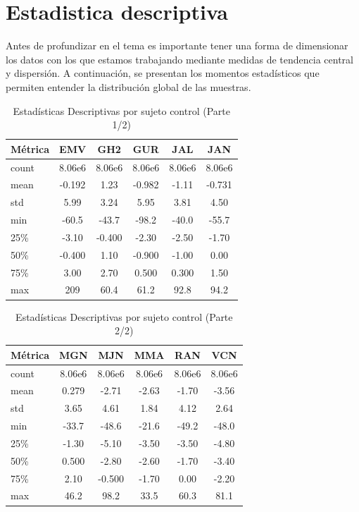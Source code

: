 \section{Estadistica descriptiva}
Antes de profundizar en el tema es importante tener una forma de dimensionar los datos con
los que estamos trabajando mediante medidas de tendencia central y dispersión. A continuación, se
presentan los momentos estadísticos que permiten entender la distribución global de las muestras.

\begin{table}[H]
\centering
\caption{Estadísticas Descriptivas por sujeto control (Parte 1/2)}
\label{tab:estadisticas1}
\begin{tabular}{lSSSSS}
\toprule
\textbf{Métrica} & \textbf{EMV} & \textbf{GH2} & \textbf{GUR} & \textbf{JAL} & \textbf{JAN} \\
\midrule
count & 8.06e6 & 8.06e6 & 8.06e6 & 8.06e6 & 8.06e6 \\
mean  & -0.192 & 1.23  & -0.982 & -1.11 & -0.731 \\
std   & 5.99  & 3.24  & 5.95  & 3.81 & 4.50  \\
min   & -60.5 & -43.7 & -98.2 & -40.0 & -55.7 \\
25\%  & -3.10 & -0.400 & -2.30 & -2.50 & -1.70 \\
50\%  & -0.400 & 1.10 & -0.900 & -1.00 & 0.00 \\
75\%  & 3.00 & 2.70 & 0.500 & 0.300 & 1.50 \\
max   & 209 & 60.4 & 61.2 & 92.8 & 94.2 \\
\bottomrule
\end{tabular}
\end{table}

\begin{table}[h]
\centering
\caption{Estadísticas Descriptivas por sujeto control (Parte 2/2)}
\label{tab:estadisticas2}
\begin{tabular}{lSSSSS}
\toprule
\textbf{Métrica} & \textbf{MGN} & \textbf{MJN} & \textbf{MMA} & \textbf{RAN} & \textbf{VCN} \\
\midrule
count & 8.06e6 & 8.06e6 & 8.06e6 & 8.06e6 & 8.06e6 \\
mean  & 0.279  & -2.71 & -2.63 & -1.70 & -3.56 \\
std   & 3.65   & 4.61  & 1.84  & 4.12  & 2.64  \\
min   & -33.7  & -48.6 & -21.6 & -49.2 & -48.0 \\
25\%  & -1.30  & -5.10 & -3.50 & -3.50 & -4.80 \\
50\%  & 0.500  & -2.80 & -2.60 & -1.70 & -3.40 \\
75\%  & 2.10   & -0.500 & -1.70 & 0.00  & -2.20 \\
max   & 46.2   & 98.2  & 33.5  & 60.3  & 81.1  \\
\bottomrule
\end{tabular}
\end{table}

